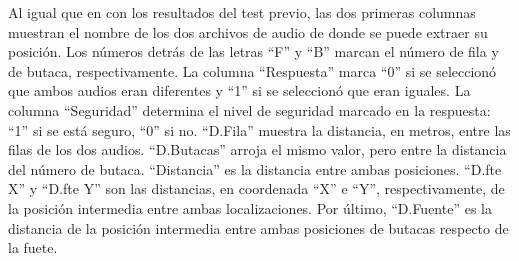\documentclass[11pt,a4paper]{book}
\begin{document}
\normalsize
Al igual que en con los resultados del test previo, las dos primeras columnas muestran el nombre de los dos archivos de audio de donde se puede extraer su posición. Los números detrás de las letras ``F'' y ``B'' marcan el número de fila y de butaca, respectivamente. La columna ``Respuesta'' marca ``0'' si se seleccionó que ambos audios eran diferentes y ``1'' si se seleccionó que eran iguales. La columna ``Seguridad'' determina el nivel de seguridad marcado en la respuesta: ``1'' si se está seguro, ``0'' si no. ``D.Fila'' muestra la distancia, en metros, entre las filas de los dos audios. ``D.Butacas'' arroja el mismo valor, pero entre la distancia del número de butaca. ``Distancia'' es la distancia entre ambas posiciones. ``D.fte X'' y ``D.fte Y'' son las distancias, en coordenada ``X'' e ``Y'', respectivamente,  de la posición intermedia entre ambas localizaciones. Por último, ``D.Fuente'' es la distancia de la posición intermedia entre ambas posiciones de butacas respecto de la fuete.
    
    
    
\end{document}
